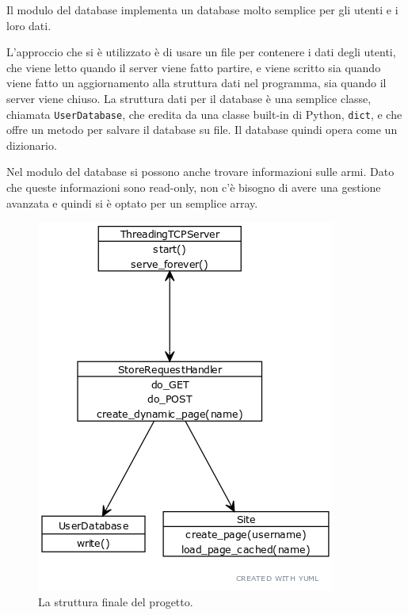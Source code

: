 \documentclass[a4paper,12pt]{report}
\begin{document}
Il modulo del database implementa un database molto semplice per gli utenti e i loro dati.

L'approccio che si è utilizzato è di usare un file per contenere i dati degli utenti, che viene letto quando il server viene fatto partire, e viene scritto sia quando viene fatto un aggiornamento alla struttura dati nel programma, sia quando il server viene chiuso. La struttura dati per il database è una semplice classe, chiamata \texttt{UserDatabase}, che eredita da una classe built-in di Python, \texttt{dict}, e che offre un metodo per salvare il database su file. Il database quindi opera come un dizionario.

Nel modulo del database si possono anche trovare informazioni sulle armi. Dato che queste informazioni sono read-only, non c'è bisogno di avere una gestione avanzata e quindi si è optato per un semplice array.

\begin{figure}[h]
\centering{}
\includegraphics[]{uml2.png}
\caption{La struttura finale del progetto.}
\label{img:uml_classes}
\end{figure}
\end{document}
